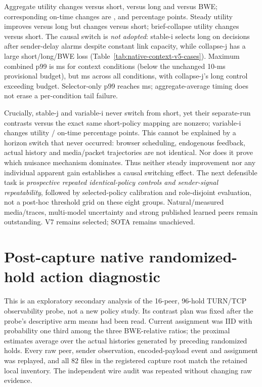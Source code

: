 \documentclass[10pt]{article}
\begin{document}
Aggregate utility changes \NativeContextShortUtility{} versus short, \NativeContextLongUtility{} versus long and \NativeContextBweUtility{} versus BWE; corresponding on-time changes are \NativeContextShortOntime{}, \NativeContextLongOntime{} and \NativeContextBweOntime{} percentage points. Steady utility improves \NativeContextStableLongUtility{} versus long but changes \NativeContextStableShortUtility{} versus short; brief-collapse utility changes \NativeContextBriefShortUtility{} versus short. The causal switch is \emph{not adopted}: stable-i selects long on \NativeContextSteadyFalseLong{} decisions after sender-delay alarms despite constant link capacity, while collapse-j has a large short/long/BWE loss (Table~\ref{tab:native-context-v5-cases}). Maximum combined p99 is \NativeContextTail{} ms for context conditions (below the unchanged 10-ms provisional budget), but \NativeContextAllTail{} ms across all conditions, with collapse-j's long control exceeding budget. Selector-only p99 reaches \NativeContextSelectorTail{} ms; aggregate-average timing does not erase a per-condition tail failure.

Crucially, stable-j and variable-i never switch from short, yet their separate-run contrasts versus the exact same short-policy mapping are nonzero; variable-i changes \NativeContextZeroSwitchUtility{} utility / \NativeContextZeroSwitchOntime{} on-time percentage points. This cannot be explained by a horizon switch that never occurred: browser scheduling, endogenous feedback, actual history and media/packet trajectories are not identical. Nor does it prove which nuisance mechanism dominates. Thus neither steady improvement nor any individual apparent gain establishes a causal switching effect. The next defensible task is \emph{prospective repeated identical-policy controls and sender-signal repeatability}, followed by selected-policy calibration and role-disjoint evaluation, not a post-hoc threshold grid on these eight groups. Natural/measured media/traces, multi-model uncertainty and strong published learned peers remain outstanding. V7 remains selected; SOTA remains unachieved.

\section{Post-capture native randomized-hold action diagnostic}
\label{app:native-turn-action}

This is an exploratory secondary analysis of the 16-peer, 96-hold TURN/TCP
observability probe, not a new policy study. Its contrast plan was fixed after
the probe's descriptive arm means had been read. Current assignment was IID with
probability one third among the three BWE-relative ratios; the proximal estimates
average over the actual histories generated by preceding randomized holds.
Every raw peer, sender observation, encoded-payload event and assignment was
replayed, and all 82 files in the registered capture root match the retained
local inventory. The independent wire audit was repeated without changing raw
evidence.
\end{document}
